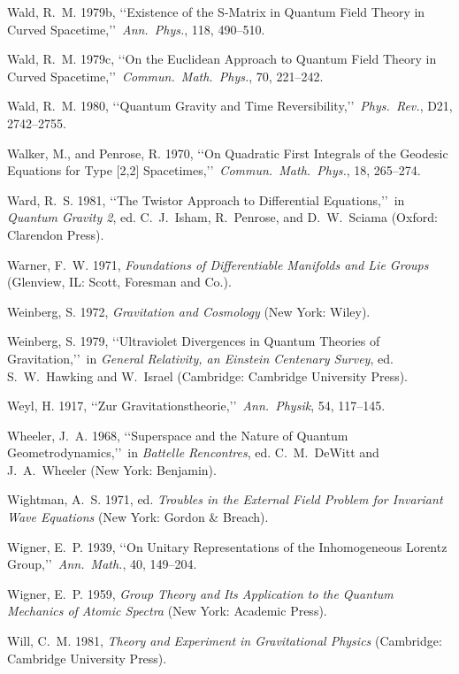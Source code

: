 \item Wald, R.~M. 1979b, \lq\lq Existence of the S-Matrix in Quantum Field Theory in Curved Spacetime,\rq\rq\ \emph{Ann.\ Phys.}, 118, 490--510.
\item Wald, R.~M. 1979c, \lq\lq On the Euclidean Approach to Quantum Field Theory in Curved Spacetime,\rq\rq\ \emph{Commun.\ Math.\ Phys.}, 70, 221--242.
\item Wald, R.~M. 1980, \lq\lq Quantum Gravity and Time Reversibility,\rq\rq\ \emph{Phys.\ Rev.}, D21, 2742--2755.
\item Walker, M., and Penrose, R. 1970, \lq\lq On Quadratic First Integrals of the Geodesic Equations for Type [2,2] Spacetimes,\rq\rq\ \emph{Commun.\ Math.\ Phys.}, 18, 265--274.

\item Ward, R.~S. 1981, \lq\lq The Twistor Approach to Differential Equations,\rq\rq\ in \emph{Quantum Gravity 2}, ed. C.~J.~Isham, R.~Penrose, and D.~W.~Sciama (Oxford: Clarendon Press).
\item Warner, F.~W. 1971, \emph{Foundations of Differentiable Manifolds and Lie Groups} (Glenview, IL: Scott, Foresman and Co.).
\item Weinberg, S. 1972, \emph{Gravitation and Cosmology} (New York: Wiley).
\item Weinberg, S. 1979, \lq\lq Ultraviolet Divergences in Quantum Theories of Gravitation,\rq\rq\ in \emph{General Relativity, an Einstein Centenary Survey}, ed. S.~W.~Hawking and W.~Israel (Cambridge: Cambridge University Press).
\item Weyl, H. 1917, \lq\lq Zur Gravitationstheorie,\rq\rq\ \emph{Ann.\ Physik}, 54, 117--145.
\item Wheeler, J.~A. 1968, \lq\lq Superspace and the Nature of Quantum Geometrodynamics,\rq\rq\ in \emph{Battelle Rencontres}, ed. C.~M.~DeWitt and J.~A.~Wheeler (New York: Benjamin).
\item Wightman, A.~S. 1971, ed. \emph{Troubles in the External Field Problem for Invariant Wave Equations} (New York: Gordon \& Breach).
\item Wigner, E.~P. 1939, \lq\lq On Unitary Representations of the Inhomogeneous Lorentz Group,\rq\rq\ \emph{Ann.\ Math.}, 40, 149--204.
\item Wigner, E.~P. 1959, \emph{Group Theory and Its Application to the Quantum Mechanics of Atomic Spectra} (New York: Academic Press).
\item Will, C.~M. 1981, \emph{Theory and Experiment in Gravitational Physics} (Cambridge: Cambridge University Press).
